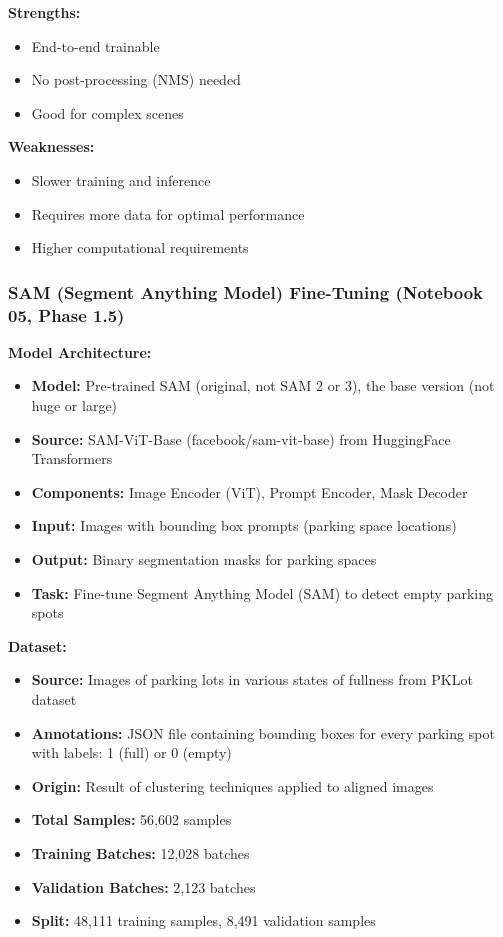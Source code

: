 \documentclass[12pt,a4paper]{article}
\begin{document}
\textbf{Strengths:}
\begin{itemize}
    \item End-to-end trainable
    \item No post-processing (NMS) needed
    \item Good for complex scenes
\end{itemize}

\textbf{Weaknesses:}
\begin{itemize}
    \item Slower training and inference
    \item Requires more data for optimal performance
    \item Higher computational requirements
\end{itemize}

\subsubsection{SAM (Segment Anything Model) Fine-Tuning (Notebook 05, Phase 1.5)}

\textbf{Model Architecture:}
\begin{itemize}
    \item \textbf{Model:} Pre-trained SAM (original, not SAM 2 or 3), the base version (not huge or large)
    \item \textbf{Source:} SAM-ViT-Base (facebook/sam-vit-base) from HuggingFace Transformers
    \item \textbf{Components:} Image Encoder (ViT), Prompt Encoder, Mask Decoder
    \item \textbf{Input:} Images with bounding box prompts (parking space locations)
    \item \textbf{Output:} Binary segmentation masks for parking spaces
    \item \textbf{Task:} Fine-tune Segment Anything Model (SAM) to detect empty parking spots
\end{itemize}

\textbf{Dataset:}
\begin{itemize}
    \item \textbf{Source:} Images of parking lots in various states of fullness from PKLot dataset
    \item \textbf{Annotations:} JSON file containing bounding boxes for every parking spot with labels: 1 (full) or 0 (empty)
    \item \textbf{Origin:} Result of clustering techniques applied to aligned images
    \item \textbf{Total Samples:} 56,602 samples
    \item \textbf{Training Batches:} 12,028 batches
    \item \textbf{Validation Batches:} 2,123 batches
    \item \textbf{Split:} 48,111 training samples, 8,491 validation samples
\end{itemize}
\end{document}
